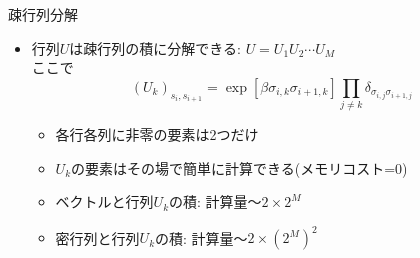 \begin{frame}[t,fragile]{疎行列分解}
  \begin{itemize}
    \setlength{\itemsep}{1em}
  \item 行列$U$は疎行列の積に分解できる: $U = U_1 U_2 \cdots U_M$ \\
    ここで
    \[
    (U_k)_{s_i, s_{i+1}} = \exp[\beta \sigma_{i,k} \sigma_{i+1,k}] \prod_{j \ne k} \delta_{\sigma_{i,j} \sigma_{i+1,j}}
    \]
    \begin{itemize}
    \item 各行各列に非零の要素は2つだけ
    \item $U_k$の要素はその場で簡単に計算できる(メモリコスト=0)
    \item ベクトルと行列$U_k$の積: 計算量〜$2 \times 2^M$
    \item 密行列と行列$U_k$の積: 計算量〜$2 \times (2^M)^2$
    \end{itemize}
  \end{itemize}
\end{frame}
